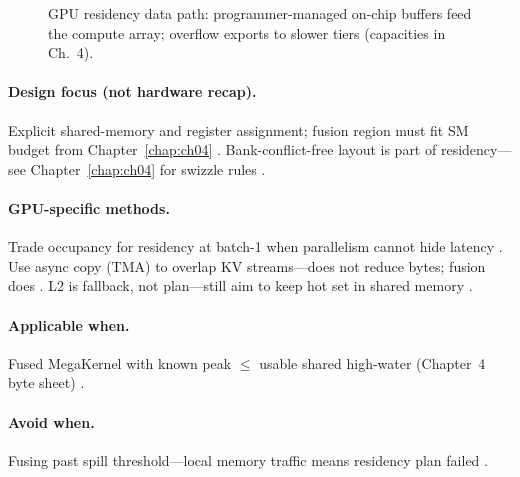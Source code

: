 \begin{figure}[t]
\centering
{}
\caption{GPU residency data path: programmer-managed on-chip buffers feed the compute array; overflow exports to slower tiers (capacities in Ch.~4).}
\label{fig:gpu_residency_architecture}
\end{figure}

\paragraph{Design focus (not hardware recap).}
Explicit shared-memory and register assignment; fusion region must fit SM budget from Chapter~\ref{chap:ch04} \citep{nvidia2022hopper,yirage2026}.
Bank-conflict-free layout is part of residency---see Chapter~\ref{chap:ch04} for swizzle rules \citep{semianalysis2024tma}.

\paragraph{GPU-specific methods.}
Trade occupancy for residency at batch-1 when parallelism cannot hide latency \citep{taxbreak2026,memoryfloor2026}.
Use async copy (TMA) to overlap KV streams---does not reduce bytes; fusion does \citep{memoryfloor2026,semianalysis2024tma}.
L2 is fallback, not plan---still aim to keep hot set in shared memory \citep{nvidia2022hopper}.

\paragraph{Applicable when.}
Fused MegaKernel with known peak $\le$ usable shared high-water (Chapter~4 byte sheet) \citep{yirage2026}.

\paragraph{Avoid when.}
Fusing past spill threshold---local memory traffic means residency plan failed \citep{memoryfloor2026,patel2025llminference}.

